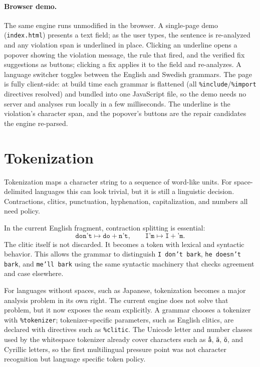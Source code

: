 \documentclass[11pt]{article}
\theoremstyle{definition}
\theoremstyle{plain}
\theoremstyle{remark}
\begin{document}
\paragraph{Browser demo.}
The same engine runs unmodified in the browser. A single-page demo
(\texttt{index.html}) presents a text field; as the user types, the sentence is
re-analyzed and any violation span is underlined in place. Clicking an
underline opens a popover showing the violation message, the rule that fired,
and the verified fix suggestions as buttons; clicking a fix applies it to the
field and re-analyzes. A language switcher toggles between the English and
Swedish grammars. The page is fully client-side: at build time each grammar is
flattened (all \texttt{\%include}/\texttt{\%import} directives resolved) and
bundled into one JavaScript file, so the demo needs no server and analyses run
locally in a few milliseconds. The underline is the violation's character span, and
the popover's buttons are the repair candidates the engine re-parsed.

\section{Tokenization}

Tokenization maps a character string to a sequence of word-like units. For space-delimited
languages this can look trivial, but it is still a linguistic decision. Contractions, clitics,
punctuation, hyphenation, capitalization, and numbers all need policy.

In the current English fragment, contraction splitting is essential:
\[
  \texttt{don't} \mapsto \texttt{do} + \texttt{n't},
  \qquad
  \texttt{I'm} \mapsto \texttt{I} + \texttt{'m}.
\]
The clitic itself is not discarded. It becomes a token with lexical and syntactic behavior.
This allows the grammar to distinguish \texttt{I don't bark}, \texttt{he doesn't bark}, and
\texttt{me'll bark} using the same syntactic machinery that checks agreement and case elsewhere.

For languages without spaces, such as Japanese, tokenization becomes a major
analysis problem in its own right. The current engine does not solve that
problem, but it now exposes the seam explicitly. A grammar chooses a tokenizer
with \texttt{\%tokenizer}; tokenizer-specific parameters, such as English
clitics, are declared with directives such as \texttt{\%clitic}. The Unicode
letter and number classes used by the whitespace tokenizer already cover
characters such as \texttt{å}, \texttt{ä}, \texttt{ö}, and Cyrillic letters, so
the first multilingual pressure point was not character recognition but language
specific token policy.
\end{document}
